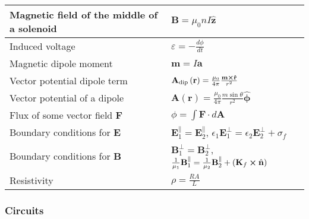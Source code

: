 \documentclass[11pt]{paper}
\begin{document}
\begin{longtable}{ll}
\multicolumn{1}{|l|}{Magnetic field of the middle of a solenoid} & \multicolumn{1}{l|}{$\mathbf{B} = \mu_0 n I\mathbf{\hat{z}}$} \\ \hline
\multicolumn{1}{|l|}{Induced voltage} & \multicolumn{1}{l|}{$\varepsilon = -\frac{d\phi}{dt}$} \\ \hline
\multicolumn{1}{|l|}{Magnetic dipole moment} & \multicolumn{1}{l|}{$\mathbf{m} = I\mathbf{a}$} \\ \hline
\multicolumn{1}{|l|}{Vector potential dipole term} & \multicolumn{1}{l|}{$\mathbf{A}_\text{dip}\left(\mathbf{r}\right) = \frac{\mu_0}{4\pi}\frac{\mathbf{m}\cross\mathbf{\hat{r}}}{r^2}$} \\ \hline
\multicolumn{1}{|l|}{Vector potential of a dipole} & \multicolumn{1}{l|}{$\mathbf{A}\left(\mathbf{r}\right) = \frac{\mu_0}{4\pi}\frac{m \sin \theta}{r^2}\mathbf{\hat{\phi}}$} \\ \hline
\multicolumn{1}{|l|}{Flux of some vector field $\mathbf{F}$} & \multicolumn{1}{l|}{$\phi = \int \mathbf{F}\cdot d\mathbf{A}$} \\ \hline
\multicolumn{1}{|l|}{Boundary conditions for $\mathbf{E}$} & \multicolumn{1}{l|}{$\mathbf{E}_{1}^{\parallel} = \mathbf{E}_{2}^{\parallel}$, $\epsilon_1\mathbf{E}_{1}^{\perp} = \epsilon_2\mathbf{E}_{2}^{\perp} + \sigma_f$} \\ \hline
\multicolumn{1}{|l|}{Boundary conditions for $\mathbf{B}$} & \multicolumn{1}{l|}{$\mathbf{B}_{1}^{\perp} =\mathbf{B}_{2}^{\perp}$, $\frac{1}{\mu_1}\mathbf{B}_{1}^{\parallel} = \frac{1}{\mu_2}\mathbf{B}_{2}^{\parallel} + \left(\mathbf{K}_f \cross \hat{\mathbf{n}}\right)$} \\ \hline
\multicolumn{1}{|l|}{Resistivity} & \multicolumn{1}{l|}{$\rho = \frac{RA}{L}$}\\\hline
\end{longtable}
\egroup

\newpage

\subsubsection*{Circuits}
\label{subsec:cir}
\end{document}
